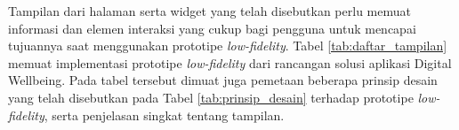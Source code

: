 Tampilan dari halaman serta widget yang telah disebutkan perlu memuat informasi dan elemen interaksi yang cukup bagi pengguna untuk mencapai tujuannya saat menggunakan prototipe \textit{low-fidelity}. Tabel \ref{tab:daftar_tampilan} memuat implementasi prototipe \textit{low-fidelity} dari rancangan solusi aplikasi Digital Wellbeing. Pada tabel tersebut dimuat juga pemetaan beberapa prinsip desain yang telah disebutkan pada Tabel \ref{tab:prinsip_desain} terhadap prototipe \textit{low-fidelity}, serta penjelasan singkat tentang tampilan.

\newpage


\newlength{\lofiwidth}
\setlength{\lofiwidth}{0.325\textwidth}

\newcommand{\lofi}[1]{\begin{center}\texttt{[image: \#1]}\end{center}}
\newcommand{\lofiwidget}[2]{\begin{center}\texttt{[image: \#2]}\end{center}}


